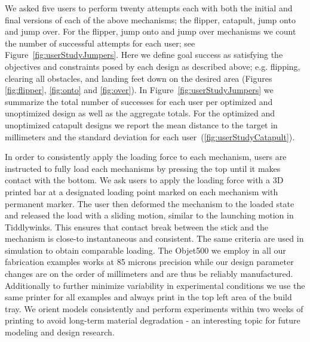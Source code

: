We asked five users to perform twenty attempts each with both the initial and final versions of each of the above mechanisms; the flipper, catapult, jump onto and jump over. For the flipper, jump onto and jump over mechanisms we count the number of successful attempts for each user; see Figure~\ref{fig:userStudyJumpers}. Here we define goal success as satisfying the objectives and constraints posed by each design as described above; e.g. flipping, clearing all obstacles, and landing feet down on the desired area (Figures \ref{fig:flipper}, \ref{fig:onto} and \ref{fig:over}).
In Figure~\ref{fig:userStudyJumpers} we summarize the total number of successes for each user per optimized and unoptimized design as well as the aggregate totals. For the optimized and unoptimized catapult designs we report the mean distance to the target in millimeters and the standard deviation for each user~(\autoref{fig:userStudyCatapult}). 

In order to consistently apply the loading force to each mechanism, users are instructed to fully load each mechanisms by pressing the top until it makes contact with the bottom. We ask users to apply the loading force with a 3D printed bar at a designated loading point marked on each mechanism with permanent marker. The user then deformed the mechanism to the loaded state and released the load with a sliding motion, similar to the launching motion in Tiddlywinks. This ensures that contact break between the stick and the mechanism is close-to instantaneous and consistent.  The same criteria are used in simulation to obtain comparable loading. The Objet500 we employ in all our fabrication examples works at 85 microns precision while our design parameter changes are on the order of millimeters and are thus be reliably manufactured. Additionally to further  minimize variability in experimental conditions we use the same printer for all examples and always print in the top left area of the build tray. We orient models consistently and perform experiments within two weeks of printing to avoid long-term material degradation - an interesting topic for future modeling and design research.

